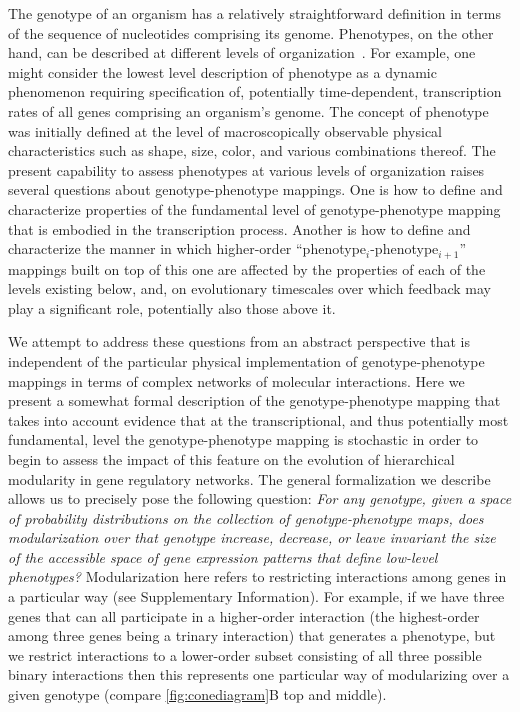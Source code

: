 The genotype of an organism has a relatively straightforward definition in terms of the sequence of nucleotides comprising its genome. Phenotypes, on the other hand, can be described at different levels of organization~\cite{Dawkins1982,Stadler2001}. For example, one might consider the lowest level description of phenotype as a dynamic phenomenon requiring specification of, potentially time-dependent, transcription rates of all genes comprising an organism's genome. The concept of phenotype was initially defined at the level of macroscopically observable physical characteristics such as shape, size, color, and various combinations thereof. The present capability to assess phenotypes at various levels of organization raises several questions about genotype-phenotype mappings. One is how to define and characterize properties of the fundamental level of genotype-phenotype mapping that is embodied in the transcription process. Another is how to define and characterize the manner in which higher-order ``phenotype$_i$-phenotype$_{i+1}$'' mappings built on top of this one are affected by the properties of each of the levels existing below, and, on evolutionary timescales over which feedback may play a significant role, potentially also those above it.

We attempt to address these questions from an abstract perspective that is independent of the particular physical implementation of genotype-phenotype mappings in terms of complex networks of molecular interactions. Here we present a somewhat formal description of the genotype-phenotype mapping that takes into account evidence that at the transcriptional, and thus potentially most fundamental, level the genotype-phenotype mapping is stochastic \cite{Swain2002,Paulsson2004,Thattai2004,Acar2008a,Lestas2010,So2011,Munsky2012,Neuert2013,Sanchez2013} in order to begin to assess the impact of this feature on the evolution of hierarchical modularity in gene regulatory networks. The general formalization we describe allows us to precisely pose the following question: \emph{For any genotype, given a space of probability distributions on the collection of genotype-phenotype maps, does modularization over that genotype increase, decrease, or leave invariant the size of the accessible space of gene expression patterns that define low-level phenotypes?} Modularization here refers to restricting interactions among genes in a particular way (see Supplementary Information). For example, if we have three genes that can all participate in a higher-order interaction (the highest-order among three genes being a trinary interaction) that generates a phenotype, but we restrict interactions to a lower-order subset consisting of all three possible binary interactions then this represents one particular way of modularizing over a given genotype (compare \ref{fig:conediagram}B top and middle).

